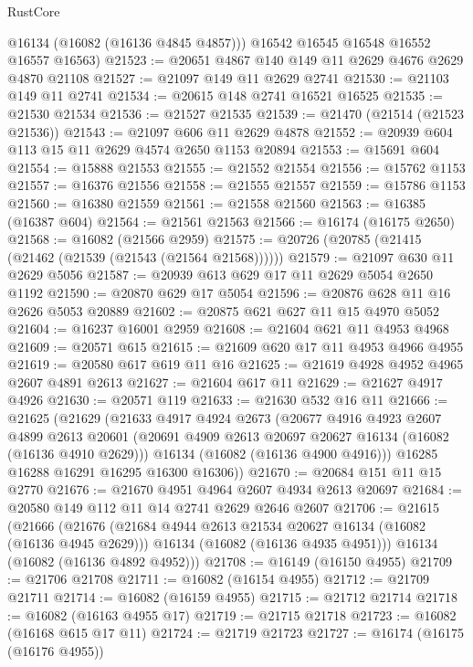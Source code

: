 \begin{lexlean}{RustCore}
\begin{coremodule}
        @16134
        (@16082 (@16136 @4845 @4857)))
      @16542
      @16545
      @16548
      @16552
      @16557
      @16563)
@21523 := @20651 @4867 @140 @149 @11 @2629 @4676 @2629 @4870 @21108
@21527 := @21097 @149 @11 @2629 @2741
@21530 := @21103 @149 @11 @2741
@21534 := @20615 @148 @2741 @16521 @16525
@21535 := @21530 @21534
@21536 := @21527 @21535
@21539 := @21470 (@21514 (@21523 @21536))
@21543 := @21097 @606 @11 @2629 @4878
@21552 := @20939 @604 @113 @15 @11 @2629 @4574 @2650 @1153 @20894
@21553 := @15691 @604
@21554 := @15888 @21553
@21555 := @21552 @21554
@21556 := @15762 @1153
@21557 := @16376 @21556
@21558 := @21555 @21557
@21559 := @15786 @1153
@21560 := @16380 @21559
@21561 := @21558 @21560
@21563 := @16385 (@16387 @604)
@21564 := @21561 @21563
@21566 := @16174 (@16175 @2650)
@21568 := @16082 (@21566 @2959)
@21575 := @20726 (@20785 (@21415 (@21462 (@21539 (@21543 (@21564 @21568))))))
@21579 := @21097 @630 @11 @2629 @5056
@21587 := @20939 @613 @629 @17 @11 @2629 @5054 @2650 @1192
@21590 := @20870 @629 @17 @5054
@21596 := @20876 @628 @11 @16 @2626 @5053 @20889
@21602 := @20875 @621 @627 @11 @15 @4970 @5052
@21604 := @16237 @16001 @2959
@21608 := @21604 @621 @11 @4953 @4968
@21609 := @20571 @615
@21615 := @21609 @620 @17 @11 @4953 @4966 @4955
@21619 := @20580 @617 @619 @11 @16
@21625 := @21619 @4928 @4952 @4965 @2607 @4891 @2613
@21627 := @21604 @617 @11
@21629 := @21627 @4917 @4926
@21630 := @20571 @119
@21633 := @21630 @532 @16 @11
@21666 := @21625
    (@21629
      (@21633
        @4917
        @4924
        @2673
        (@20677
          @4916
          @4923
          @2607
          @4899
          @2613
          @20601
          (@20691 @4909 @2613 @20697 @20627 @16134 (@16082 (@16136 @4910 @2629)))
          @16134
          (@16082 (@16136 @4900 @4916)))
        @16285
        @16288
        @16291
        @16295
        @16300
        @16306))
@21670 := @20684 @151 @11 @15 @2770
@21676 := @21670 @4951 @4964 @2607 @4934 @2613 @20697
@21684 := @20580 @149 @112 @11 @14 @2741 @2629 @2646 @2607
@21706 := @21615
    (@21666
      (@21676
        (@21684 @4944 @2613 @21534 @20627 @16134 (@16082 (@16136 @4945 @2629)))
        @16134
        (@16082 (@16136 @4935 @4951)))
      @16134
      (@16082 (@16136 @4892 @4952)))
@21708 := @16149 (@16150 @4955)
@21709 := @21706 @21708
@21711 := @16082 (@16154 @4955)
@21712 := @21709 @21711
@21714 := @16082 (@16159 @4955)
@21715 := @21712 @21714
@21718 := @16082 (@16163 @4955 @17)
@21719 := @21715 @21718
@21723 := @16082 (@16168 @615 @17 @11)
@21724 := @21719 @21723
@21727 := @16174 (@16175 (@16176 @4955))

\end{coremodule}
\end{lexlean}
